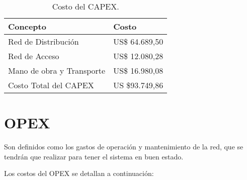 \begin{table}[H]
\centering
\begin{tabular}{|l|l|}
\hline
\rowcolor[HTML]{C5D9F1}
Concepto                  & Costo          \\ \hline
Red de Distribución       & US\$ 64.689,50   \\ \hline
Red de Acceso             & US\$ 12.080,28 \\ \hline
Mano de obra y Transporte & US\$ 16.980,08     \\ \hline
Costo Total del CAPEX     & US \$93.749,86 \\ \hline
\end{tabular}
  \caption{Costo del CAPEX.}
  \label{tab:capex}
\end{table}






\section{OPEX}

Son definidos como los gastos de operación y mantenimiento de la red, que se tendrán que realizar para tener el sistema en buen estado.

Los costos del OPEX se detallan a continuación:


